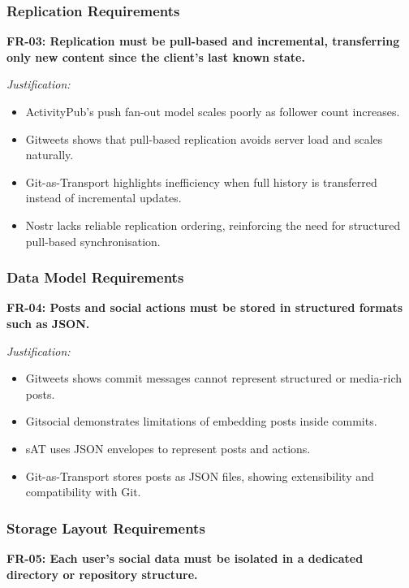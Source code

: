 \subsubsection*{Replication Requirements}

\textbf{FR-03: Replication must be pull-based and incremental, transferring only new content since the client’s last known state.}

\textit{Justification:}
\begin{itemize}
    \item ActivityPub’s push fan-out model scales poorly as follower count increases.
    \item Gitweets shows that pull-based replication avoids server load and scales naturally.
    \item Git-as-Transport highlights inefficiency when full history is transferred instead of incremental updates.
    \item Nostr lacks reliable replication ordering, reinforcing the need for structured pull-based synchronisation.
\end{itemize}

\subsubsection*{Data Model Requirements}

\textbf{FR-04: Posts and social actions must be stored in structured formats such as JSON.}

\textit{Justification:}
\begin{itemize}
    \item Gitweets shows commit messages cannot represent structured or media-rich posts.
    \item Gitsocial demonstrates limitations of embedding posts inside commits.
    \item sAT uses JSON envelopes to represent posts and actions.
    \item Git-as-Transport stores posts as JSON files, showing extensibility and compatibility with Git.
\end{itemize}

\subsubsection*{Storage Layout Requirements}

\textbf{FR-05: Each user's social data must be isolated in a dedicated directory or repository structure.}

